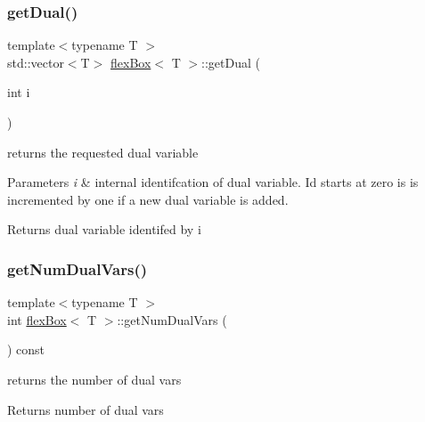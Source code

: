 \subsubsection{\texorpdfstring{get\+Dual()}{getDual()}}
{\footnotesize\ttfamily template$<$typename T $>$ \\
std\+::vector$<$T$>$ \hyperlink{classflex_box}{flex\+Box}$<$ T $>$\+::get\+Dual (\begin{DoxyParamCaption}\item[{int}]{i }\end{DoxyParamCaption})\hspace{0.3cm}{\ttfamily [inline]}}



returns the requested dual variable 


\begin{DoxyParams}{Parameters}
{\em i} & internal identifcation of dual variable. Id starts at zero is is incremented by one if a new dual variable is added. \\
\hline
\end{DoxyParams}
\begin{DoxyReturn}{Returns}
dual variable identifed by i 
\end{DoxyReturn}
\mbox{\label{classflex_box_ab6c7512dee891983f60e0f3a63bff8b5}} 
\subsubsection{\texorpdfstring{get\+Num\+Dual\+Vars()}{getNumDualVars()}}
{\footnotesize\ttfamily template$<$typename T $>$ \\
int \hyperlink{classflex_box}{flex\+Box}$<$ T $>$\+::get\+Num\+Dual\+Vars (\begin{DoxyParamCaption}{ }\end{DoxyParamCaption}) const\hspace{0.3cm}{\ttfamily [inline]}}



returns the number of dual vars 

\begin{DoxyReturn}{Returns}
number of dual vars 
\end{DoxyReturn}
\mbox{\label{classflex_box_a367b7a1fe57fd898ef7ad4159ed14a62}} 

